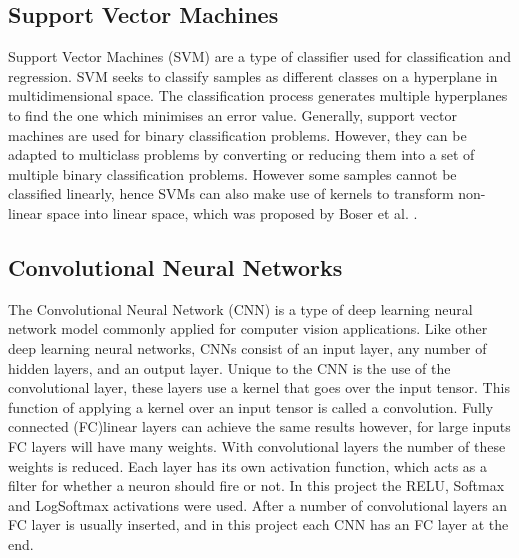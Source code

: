 \subsection{Support Vector Machines}
    Support Vector Machines (SVM) are a type of classifier used for classification and regression. SVM seeks to classify samples as different classes
    on a hyperplane in multidimensional space. The classification process generates multiple hyperplanes to find the one which minimises an error value.
    Generally, support vector machines are used for binary classification problems. However, they can be adapted to multiclass problems by converting
    or reducing them into a set of multiple binary classification problems. However some samples cannot be classified linearly, hence SVMs can also make
    use of kernels to transform non-linear space into linear space, which was proposed by Boser et al. \cite{Boser1992}.


\subsection{Convolutional Neural Networks}
The Convolutional Neural Network (CNN) is a type of deep learning neural network model commonly applied for computer vision applications.
Like other deep learning neural networks, CNNs consist of an input layer, any number of hidden layers, and an output layer.
Unique to the CNN is the use of the convolutional layer, these layers use a kernel that goes over the input tensor.
This function of applying a kernel over an input tensor is called a convolution.
Fully connected (FC)linear layers can achieve the same results however, for large inputs FC layers will have many weights.
With convolutional layers the number of these weights is reduced.
Each layer has its own activation function, which acts as a filter for whether a neuron should fire or not.
In this project the RELU, Softmax and LogSoftmax activations were used.
After a number of convolutional layers an FC layer is usually inserted, and in this project each CNN has an FC layer at the end.

